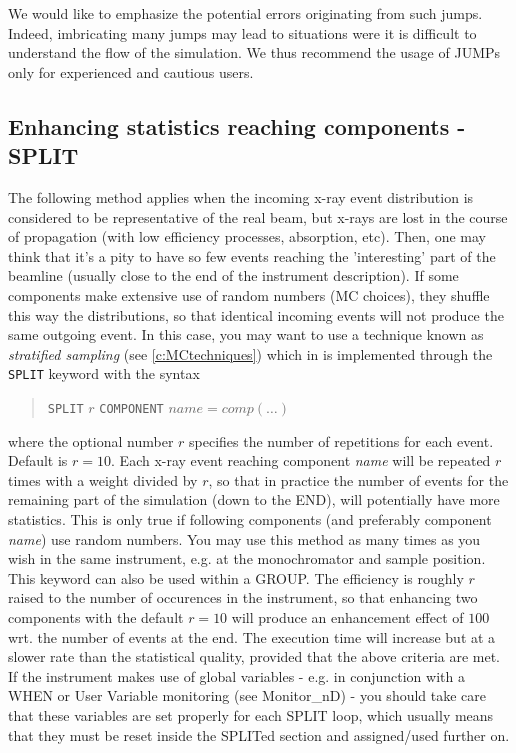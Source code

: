 We would like to emphasize the potential errors originating from such
jumps. Indeed, imbricating many jumps may lead to situations were it
is difficult to understand the flow of the simulation. We thus recommend the usage of JUMPs only for experienced and cautious users.

\subsection{Enhancing statistics reaching components - SPLIT}
\label{s:instrdefs-extend-enhance}

The following method applies when the incoming x-ray event distribution is considered to be representative of the real beam, but x-rays are lost in the course of propagation (with
low efficiency processes, absorption, etc). Then, one may think that it's a pity to have so few events reaching the 'interesting' part of the beamline (usually close to the end
of the instrument description).
If some components make extensive use of random numbers (MC choices), they shuffle this way the distributions, so that identical incoming events will not produce the same outgoing
event. In this case, you may want to use a technique known as \emph{stratified sampling} (see \cref{c:MCtechniques}) which in \MCX is implemented through the \verb+SPLIT+ keyword with the syntax

\begin{quote}
  \texttt{SPLIT} ${r}$ \texttt{COMPONENT} $\textit{name} = \textit{comp}(\ldots)$
\end{quote}

where the optional number $r$ specifies the number of repetitions for each event. Default is $r=10$.
Each x-ray event reaching component \textit{name} will be repeated $r$ times with a weight divided by $r$, so that in practice the number of events for the remaining part of the
simulation (down to the END), will potentially have more statistics. This is only true if following components (and preferably component \textit{name}) use random numbers. You may
use this method as many times as you wish in the same instrument, e.g. at the monochromator and sample position. This keyword can also be used within a GROUP. The efficiency is
roughly $r$ raised to the number of occurences in the instrument, so that enhancing two components with the default $r=10$ will produce an enhancement effect of $100$ wrt.
the number of events at the end. The execution time will increase but at a slower rate than the statistical quality, provided that the above criteria are met. If the
instrument makes use of global variables - e.g. in conjunction with a WHEN or User Variable monitoring (see Monitor\_nD) - you should take care that these variables are set
properly for each SPLIT loop, which usually means that they must be reset inside the SPLITed section and assigned/used further on. 


